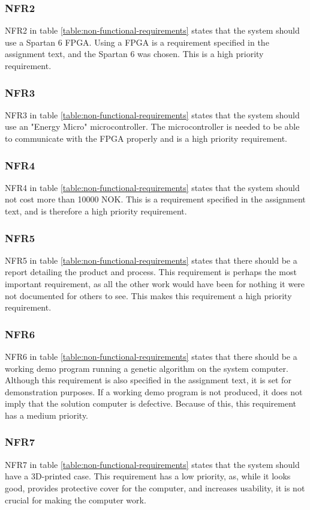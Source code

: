 \subsubsection{NFR2}

NFR2 in table \vref{table:non-functional-requirements} states that the system should use a Spartan 6 FPGA.
Using a FPGA is a requirement specified in the assignment text, and the Spartan 6 was chosen. This is a high priority requirement. 

\subsubsection{NFR3}

NFR3 in table \vref{table:non-functional-requirements} states that the system should use an "Energy Micro" microcontroller.
The microcontroller is needed to be able to communicate with the FPGA properly and is a high priority requirement.

\subsubsection{NFR4}

NFR4 in table \vref{table:non-functional-requirements} states that the system should not cost more than 10000 NOK.
This is a requirement specified in the assignment text, and is therefore a high priority requirement.

\subsubsection{NFR5}

NFR5 in table \vref{table:non-functional-requirements} states that there should be a report detailing the product and process.
This requirement is perhaps the most important requirement, as all the other work would have been for nothing it were not documented for others to see.
This makes this requirement a high priority requirement.

\subsubsection{NFR6}

NFR6 in table \vref{table:non-functional-requirements} states that there should be a working demo program running a genetic algorithm on the system computer.
Although this requirement is also specified in the assignment text, it is set for demonstration purposes.
If a working demo program is not produced, it does not imply that the solution computer is defective.
Because of this, this requirement has a medium priority.

\subsubsection{NFR7}

NFR7 in table \vref{table:non-functional-requirements} states that the system should have a 3D-printed case.
This requirement has a low priority, as, while it looks good, provides protective cover for the computer, and increases usability, it is not crucial for making the computer work.

